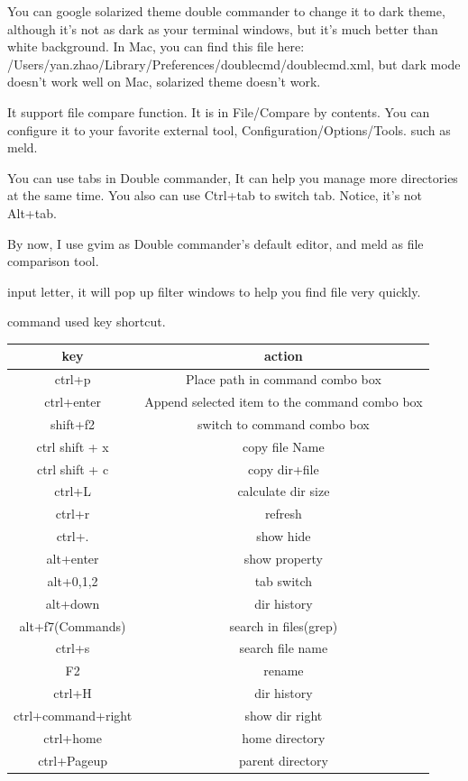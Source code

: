 \documentclass[paper=8.5in:11in, twoside, 12pt, pagesize=pdftex]{book}
\begin{document}
You can google solarized theme double commander to change it to dark theme, although it's not as dark as your terminal windows, but it's much better than white background.  In Mac, you can find this file here: /Users/yan.zhao/Library/Preferences/doublecmd/doublecmd.xml, but dark mode doesn't work well on Mac, solarized theme doesn't work.
	
It support file compare function. It is in File/Compare by contents.  You can configure it to your favorite external tool, Configuration/Options/Tools. such as meld. 
	
You can use tabs in Double commander, It can help you manage more directories at the same time. You also can use Ctrl+tab to switch tab. Notice, it's not Alt+tab. 
	
By now, I use gvim as Double commander's default editor, and meld as file comparison tool. 
	
input letter, it will pop up filter windows to help you find file very quickly.
	
command used key shortcut.\\			
	
	\begin{tabular}{|c|c|}
		\hline 
		\textbf{key} & \textbf{action} \\ 
		\hline 
		ctrl+p & Place path in command combo box   \\ 
		\hline 
		ctrl+enter  & Append selected item to the command combo box \\ 
		\hline 
		shift+f2  & switch to command combo box \\ 
		
		\hline 
		ctrl shift + x & copy file Name \\ 
		\hline 
		ctrl shift + c & copy dir+file \\ 
		
		\hline \hline  
		ctrl+L & calculate dir size  \\ 
		\hline 
		ctrl+r & refresh  \\ 
		\hline 
		ctrl+.  & show hide  \\ 
		\hline 
		alt+enter & show property \\ 
		
		\hline 
		alt+0,1,2 & tab switch  \\ 
		\hline 
		alt+down & dir history  \\ 
		
		\hline 
		alt+f7(Commands) & search in files(grep) \\ 
		\hline 
		ctrl+s  & search file name \\ 
		\hline 
		F2  & rename \\ 
		\hline
		ctrl+H  & dir history \\ 
		
		\hline 
		ctrl+command+right  & show dir right  \\ 
		\hline 
		ctrl+home  & home directory \\ 
		\hline 
		ctrl+Pageup  & parent directory  \\ 
		\hline 
		
	\end{tabular} 
\end{document}
